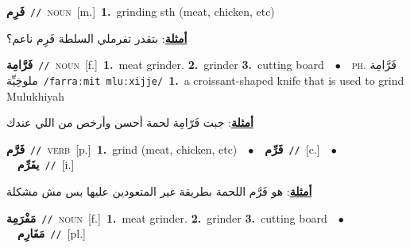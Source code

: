 \documentclass[10pt,a4paper,twoside]{article} %
\begin{document}
\begin{multicols}{2}
{\setlength\topsep{0pt}\textbf{\foreignlanguage{arabic}{فَرِم}}\ {\color{gray}\texttt{//}\color{black}}\ \textsc{noun}\ [m.]\ \textbf{1.}~grinding sth (meat, chicken, etc)\  \begin{flushright}\color{gray}\foreignlanguage{arabic}{\textbf{\underline{\foreignlanguage{arabic}{أمثلة}}}: بتقدر تفرملي السلطة فَرِم ناعم؟}\end{flushright}\color{black}} \vspace{2mm}

{\setlength\topsep{0pt}\textbf{\foreignlanguage{arabic}{فَرَّامِة}}\ {\color{gray}\texttt{//}\color{black}}\ \textsc{noun}\ [f.]\ \textbf{1.}~meat grinder.  \textbf{2.}~grinder  \textbf{3.}~cutting board\ \ $\bullet$\ \ \textsc{ph.} \color{gray} \foreignlanguage{arabic}{فَرَّامِة ملوخِيِّة}\color{black}\ {\color{gray}\texttt{/{\sffamily farraːmit mluːxijje}/}\color{black}}\ \textbf{1.}~a croissant-shaped knife that is used to grind Mulukhiyah\  \begin{flushright}\color{gray}\foreignlanguage{arabic}{\textbf{\underline{\foreignlanguage{arabic}{أمثلة}}}: جبت فَرّامِة لحمة أحسن وأرخص من اللي عندك}\end{flushright}\color{black}} \vspace{2mm}

{\setlength\topsep{0pt}\textbf{\foreignlanguage{arabic}{فَرَّم}}\ {\color{gray}\texttt{//}\color{black}}\ \textsc{verb}\ [p.]\ \textbf{1.}~grind (meat, chicken, etc)\ \ $\bullet$\ \ \setlength\topsep{0pt}\textbf{\foreignlanguage{arabic}{فَرِّم}}\ {\color{gray}\texttt{//}\color{black}}\ [c.]\ \ $\bullet$\ \ \setlength\topsep{0pt}\textbf{\foreignlanguage{arabic}{يفَرِّم}}\ {\color{gray}\texttt{//}\color{black}}\ [i.]\  \begin{flushright}\color{gray}\foreignlanguage{arabic}{\textbf{\underline{\foreignlanguage{arabic}{أمثلة}}}: هو فَرَّم اللحمة بطريقة غير المتعودين عليها بس مش مشكلة}\end{flushright}\color{black}} \vspace{2mm}

{\setlength\topsep{0pt}\textbf{\foreignlanguage{arabic}{مَفْرَمِة}}\ {\color{gray}\texttt{//}\color{black}}\ \textsc{noun}\ [f.]\ \textbf{1.}~meat grinder.  \textbf{2.}~grinder  \textbf{3.}~cutting board\ \ $\bullet$\ \ \setlength\topsep{0pt}\textbf{\foreignlanguage{arabic}{مَفَارِم}}\ {\color{gray}\texttt{//}\color{black}}\ [pl.]\ } \vspace{2mm}


\end{multicols}
\end{document}
